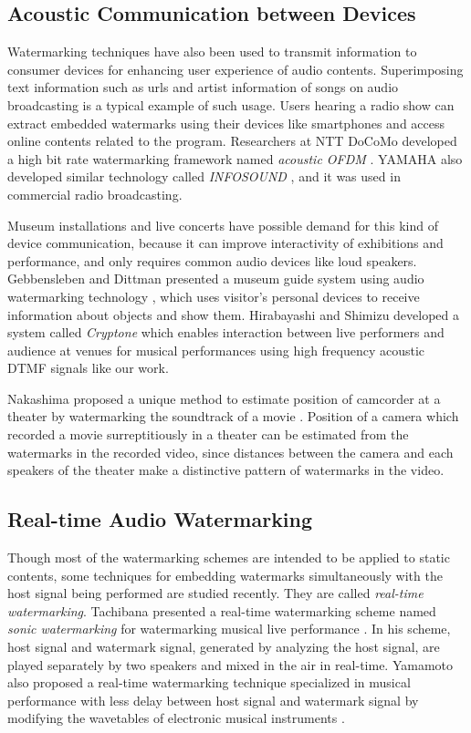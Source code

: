 \subsection{Acoustic Communication between Devices}
Watermarking techniques have also been used to transmit information to consumer devices for enhancing user experience of audio contents.
Superimposing text information such as urls and artist information of songs on audio broadcasting is a typical example of such usage.
Users hearing a radio show can extract embedded watermarks using their devices like smartphones and access online contents related to the program.
Researchers at NTT DoCoMo developed a high bit rate watermarking framework named {\it acoustic OFDM} \cite{matsuoka2008acoustic}. YAMAHA also developed similar technology called {\it INFOSOUND} \cite{infosound}, and it was used in commercial radio broadcasting.

Museum installations and live concerts have possible demand for this kind of device communication, because it can improve interactivity of exhibitions and performance, and only requires common audio devices like loud speakers.
Gebbensleben and Dittman presented a museum guide system using audio watermarking technology \cite{gebbensleben2006multimodal}, which uses visitor's personal devices to receive information about objects and show them.
Hirabayashi and Shimizu developed a system called {\it Cryptone} which enables interaction between live performers and audience at venues for musical performances using high frequency acoustic DTMF signals like our work. \cite{Hirabayashi:2012:CIP:2407707.2407712}

Nakashima proposed a unique method to estimate position of camcorder at a theater by watermarking the soundtrack of a movie \cite{nakashima2009watermarked}. Position of a camera which recorded a movie surreptitiously in a theater can be estimated from the watermarks in the recorded video, since distances between the camera and each speakers of the theater make a distinctive pattern of watermarks in the video.

\subsection{Real-time Audio Watermarking}
Though most of the watermarking schemes are intended to be applied to static contents, some techniques for embedding watermarks simultaneously with the host signal being performed are studied recently. They are called {\it real-time watermarking}.
Tachibana presented a real-time watermarking scheme named {\it sonic watermarking} for watermarking musical live performance \cite{tachibana2003audio}. In his scheme, host signal and watermark signal, generated by analyzing the host signal, are played separately by two speakers and mixed in the air in real-time.
Yamamoto also proposed a real-time watermarking technique specialized in musical performance with less delay between host signal and watermark signal by modifying the wavetables of electronic musical instruments \cite{yamamoto2010real}.
